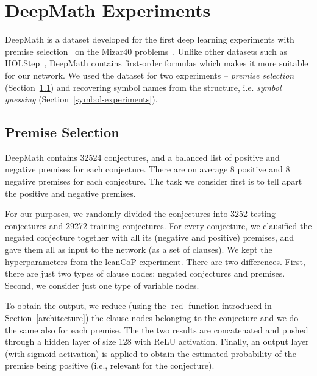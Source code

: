 \documentclass{ecai}
\def\systemname#1{\textsf{#1}\xspace}
\newcommand{\lc}{\systemname{leanCoP}}
\newcommand{\red}{\mathop{\mathrm{red}}\limits}
\DeclareMathOperator{\ReLU}{ReLU}
\begin{document}

\section{DeepMath Experiments}
\label{deepmath-experiments}
DeepMath is a dataset developed for the
first deep learning experiments with premise selection~\cite{IrvingSAECU16ju} on the Mizar40
problems~\cite{KaliszykU13b}. Unlike other datasets such as
HOLStep~\cite{DBLP:conf/iclr/KaliszykCS17}, DeepMath contains first-order formulas
which makes it more suitable for our network. We used the dataset for
two experiments -- \emph{premise selection} (Section~\ref{premise-experiments}) and recovering symbol names from the structure, i.e. \emph{symbol guessing} (Section~\ref{symbol-experiments}).

\subsection{Premise Selection}
\label{premise-experiments}
DeepMath contains 32524 conjectures, and a balanced list of positive
and negative premises for each conjecture. There are on average 8
positive and 8 negative premises for each conjecture. The task we consider first is to
tell apart the positive and negative premises.

For our purposes, we randomly divided the conjectures into 3252 testing
conjectures and 29272 training conjectures. For every conjecture,
we clausified the negated conjecture together with
all its (negative and positive) premises, and gave them all as input to the
network (as a set of clauses). We kept the hyperparameters 
from the \lc experiment. There are two differences. First, there
are just two types of clause nodes: negated conjectures and premises.
Second, we consider just one type of variable nodes.

To obtain the output, we reduce (using the $\red$ function introduced
 in Section~\ref{architecture}) the clause nodes belonging to the conjecture and we do the same
also for each premise. The the two results are concatenated and pushed through a
hidden layer of size 128 with ReLU activation. Finally,
an output layer (with sigmoid activation) is applied to obtain the
estimated probability of the %
premise being positive (i.e., relevant for the conjecture).
\end{document}
